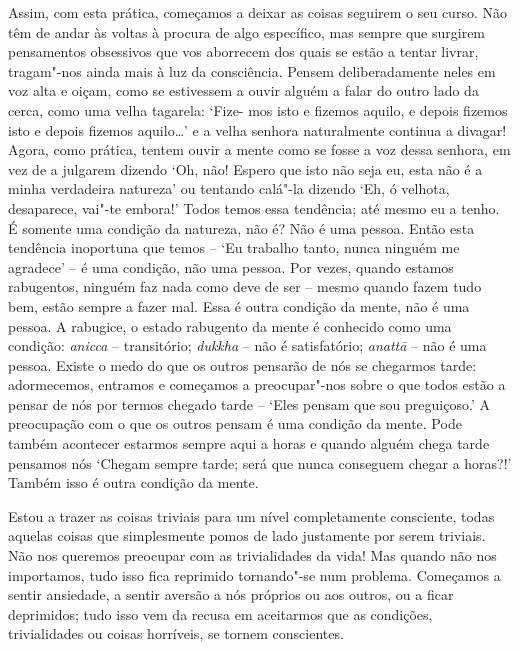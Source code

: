 Assim, com esta prática, começamos a deixar as coisas seguirem o seu
curso. Não têm de andar às voltas à procura de algo específico, mas
sempre que surgirem pensamentos obsessivos que vos aborrecem dos quais
se estão a tentar livrar, tragam"-nos ainda mais à luz da consciência.
Pensem deliberadamente neles em voz alta e oiçam, como se estivessem a
ouvir alguém a falar do outro lado da cerca, como uma velha tagarela:
`Fize- mos isto e fizemos aquilo, e depois fizemos isto e depois fizemos
aquilo\ldots{}' e a velha senhora naturalmente continua a divagar!
Agora, como prática, tentem ouvir a mente como se fosse a voz dessa
senhora, em vez de a julgarem dizendo `Oh, não! Espero que isto não seja
eu, esta não é a minha verdadeira natureza' ou tentando calá"-la dizendo
`Eh, ó velhota, desaparece, vai"-te embora!' Todos temos essa tendência;
até mesmo eu a tenho. É somente uma condição da natureza, não é? Não é
uma pessoa. Então esta tendência inoportuna que temos -- `Eu trabalho
tanto, nunca ninguém me agradece' -- é uma condição, não uma pessoa. Por
vezes, quando estamos rabugentos, ninguém faz nada como deve de ser --
mesmo quando fazem tudo bem, estão sempre a fazer mal. Essa é outra
condição da mente, não é uma pessoa.
A rabugice, o estado rabugento da mente é conhecido como
uma condição: \emph{anicca} -- transitório; \emph{dukkha} -- não é
satisfatório; \emph{anattā} -- não é uma pessoa. Existe o medo do que os
outros pensarão de nós se chegarmos tarde: adormecemos, entramos e
começamos a preocupar"-nos sobre o que todos estão a pensar de nós por
termos chegado tarde -- `Eles pensam que sou preguiçoso.' A preocupação
com o que os outros pensam é uma condição da mente. Pode também
acontecer estarmos sempre aqui a horas e quando alguém chega tarde
pensamos nós `Chegam sempre tarde; será que nunca conseguem chegar a
horas?!' Também isso é outra condição da mente.

Estou a trazer as coisas triviais para um nível completamente
consciente, todas aquelas coisas que simplesmente pomos de lado
justamente por serem triviais. Não nos queremos preocupar com as
trivialidades da vida! Mas quando não nos importamos, tudo isso fica
reprimido tornando"-se num problema. Começamos a sentir ansiedade, a
sentir aversão a nós próprios ou aos outros, ou a ficar deprimidos; tudo
isso vem da recusa em aceitarmos que as condições, trivialidades ou
coisas horríveis, se tornem conscientes.

